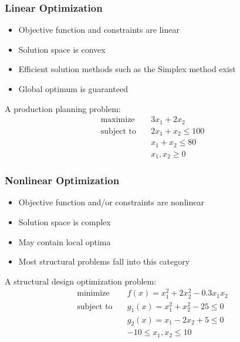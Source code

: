 \subsubsection{Linear Optimization}
\begin{itemize}
    \item Objective function and constraints are linear
    \item Solution space is convex
    \item Efficient solution methods such as the Simplex method exist
    \item Global optimum is guaranteed
\end{itemize}

\begin{tcolorbox}[title=Linear Optimization Example]
A production planning problem:
\begin{equation*}
\begin{aligned}
\text{maximize} \quad & 3x_1 + 2x_2 \\
\text{subject to} \quad & 2x_1 + x_2 \leq 100 \\
& x_1 + x_2 \leq 80 \\
& x_1, x_2 \geq 0
\end{aligned}
\end{equation*}
\end{tcolorbox}

\subsubsection{Nonlinear Optimization}
\begin{itemize}
    \item Objective function and/or constraints are nonlinear
    \item Solution space is complex
    \item May contain local optima
    \item Most structural problems fall into this category 
\end{itemize}

\begin{tcolorbox}[title=Nonlinear Optimization Example]
    A structural design optimization problem:
    \begin{equation*}
    \begin{aligned}
    \text{minimize} \quad & f(x) = x_1^2 + 2x_2^2 - 0.3x_1x_2 \\
    \text{subject to} \quad & g_1(x) = x_1^2 + x_2^2 - 25 \leq 0 \\
    & g_2(x) = x_1 - 2x_2 + 5 \leq 0 \\
    & -10 \leq x_1, x_2 \leq 10
    \end{aligned}
    \end{equation*}
    \end{tcolorbox}



